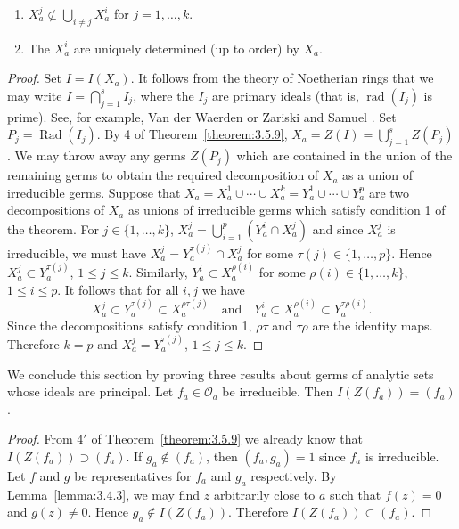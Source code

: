 \begin{enumerate}
\item $X_a^j\not\subset\bigcup_{i\ne j}X_a^i$ for $j=1,\ldots,k$.
\item The $X_a^i$ are uniquely determined (up to order) by $X_a$.
\end{enumerate}
\begin{proof}
Set $I=I(X_a)$. It follows from the theory of Noetherian rings that we may write $I=\bigcap_{j=1}^s I_j$, where the $I_j$ are primary ideals (that is, $\operatorname{rad}(I_j)$ is prime). See, for example, Van der Waerden \cite{bib:I:waerden-b-l-van-der:2} or Zariski and Samuel \cite{bib:I:zariski-o-and-samuel-p:1}. Set $P_j=\operatorname{Rad}(I_j)$. By 4 of Theorem~\ref{theorem:3.5.9}, $X_a=Z(I)=\bigcup_{j=1}^s Z(P_j)$. We may throw away any germs $Z(P_j)$ which are contained in the union of the remaining germs to obtain the required decomposition of $X_a$ as a union of irreducible germs. Suppose that
$X_a=X_a^1\cup\cdots\cup X_a^k=Y_a^1\cup\cdots\cup Y_a^p$ are two decompositions of $X_a$ as unions of irreducible germs which satisfy condition 1 of the theorem. For $j\in\{1,\ldots,k\}$, $X_a^j=\bigcup_{i=1}^p(Y_a^i\cap X_a^j)$ and since $X_a^j$ is irreducible, we must have $X_a^j=Y_a^{\tau(j)}\cap X_a^j$ for some $\tau(j)\in\{1,\ldots,p\}$. Hence $X_a^j\subset Y_a^{\tau(j)}$, $1\leq j\leq k$. Similarly, $Y_a^i\subset X_a^{\rho(i)}$ for some $\rho(i)\in\{1,\ldots,k\}$, $1\leq i\leq p$. It follows that for all $i,j$ we have
\[X_a^j\subset Y_a^{\tau(j)}\subset X_a^{\rho\tau(j)}\quad\text{and}\quad Y_a^i\subset X_a^{\rho(i)}\subset Y_a^{\tau\rho(i)}.\]
Since the decompositions satisfy condition 1, $\rho\tau$ and $\tau\rho$ are the identity maps. Therefore $k=p$ and $X_a^j=Y_a^{\tau(j)}$, $1\leq j\leq k$.
\end{proof}
We conclude this section by proving three results about germs of analytic sets whose ideals are principal.
 Let $f_a\in\mathcal O_a$ be irreducible. Then $I(Z(f_a))=(f_a)$.
\begin{proof}
From $4'$ of Theorem~\ref{theorem:3.5.9} we already know that $I(Z(f_a))\supset(f_a)$. If $g_a\notin(f_a)$, then $(f_a,g_a)=1$ since $f_a$ is irreducible. Let $f$ and $g$ be representatives for $f_a$ and $g_a$ respectively. By Lemma~\ref{lemma:3.4.3}, we may find $z$ arbitrarily close to $a$ such that $f(z)=0$ and $g(z)\ne0$. Hence $g_a\notin I(Z(f_a))$. Therefore $I(Z(f_a))\subset(f_a)$.
\end{proof}
